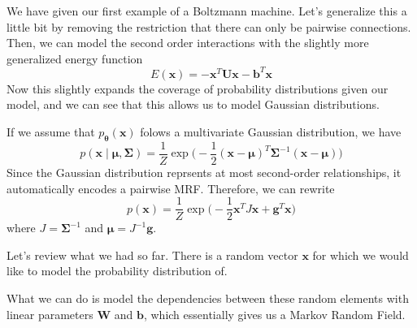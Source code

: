   We have given our first example of a Boltzmann machine. Let's generalize this a little bit by removing the restriction that there can only be pairwise connections. Then, we can model the second order interactions with the slightly more generalized energy function
    \[E(\mathbf{x}) = -\mathbf{x}^T \mathbf{U} \mathbf{x} - \mathbf{b}^T \mathbf{x}\]
  Now this slightly expands the coverage of probability distributions given our model, and we can see that this allows us to model Gaussian distributions. 

  \begin{example} 
    If we assume that $p_{\boldsymbol{\theta}} ( \mathbf{x})$ folows a multivariate Gaussian distribution, we have 
      \[p(\mathbf{x} \mid \boldsymbol{\mu}, \boldsymbol{\Sigma}) = \frac{1}{Z} \exp \bigg( -\frac{1}{2} (\mathbf{x} - \boldsymbol{\mu})^T \boldsymbol{\Sigma}^{-1} (\mathbf{x} - \boldsymbol{\mu}) \bigg)\]
    Since the Gaussian distribution reprsents at most second-order relationships, it automatically encodes a pairwise MRF. Therefore, we can rewrite 
      \[p(\mathbf{x}) = \frac{1}{Z} \exp \bigg( -\frac{1}{2} \mathbf{x}^T J\mathbf{x} + \mathbf{g}^T \mathbf{x} \bigg)\] 
    where $J = \boldsymbol{\Sigma}^{-1}$ and $\boldsymbol{\mu} = J^{-1} \mathbf{g}$. 
  \end{example}

  Let's review what we had so far. There is a random vector $\mathbf{x}$ for which we would like to model the probability distribution of. 

  \begin{center}
  \end{center}

  What we can do is model the dependencies between these random elements with linear parameters $\mathbf{W}$ and $\mathbf{b}$, which essentially gives us a Markov Random Field.  

